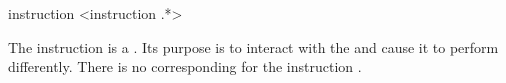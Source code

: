 \begin{identifier}{instruction}
\! <instruction .*>
\end{identifier}

The instruction is a . Its purpose is to interact with the  and cause it to perform differently. There is no corresponding  for the instruction . \\






